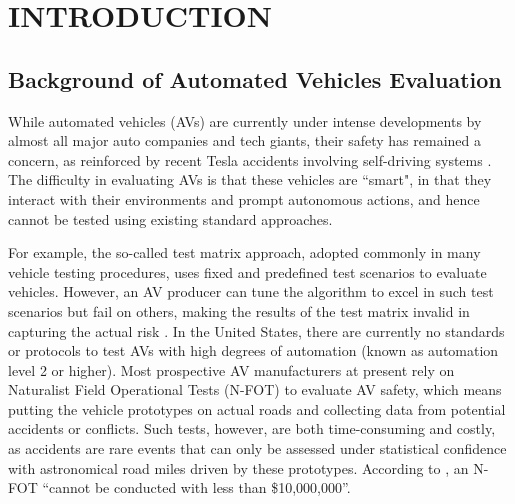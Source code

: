 \documentclass{wscpaperproc}
\theoremstyle{wsc}
\begin{document}
\section{INTRODUCTION}                                                                          
\subsection{Background of Automated Vehicles Evaluation}
While automated vehicles (AVs) are currently under intense developments by almost all major auto companies and tech giants, their safety has remained a concern, as reinforced by recent Tesla accidents involving self-driving systems \cite{teslanews}. The difficulty in evaluating AVs is that these vehicles are ``smart", in that they interact with their environments and prompt autonomous actions, and hence cannot be tested using existing standard approaches. 

For example, the so-called test matrix approach, adopted commonly in many vehicle testing procedures, uses fixed and predefined test scenarios to evaluate vehicles. However, an AV producer can tune the algorithm to excel in such test scenarios but fail on others, making the results of the test matrix invalid in capturing the actual risk \cite{Aust2012EvaluationSystems}. In the United States, there are currently no standards or protocols to test AVs with high degrees of automation (known as automation level 2 \cite{national2013preliminary} or higher). Most prospective AV manufacturers at present rely on Naturalist Field Operational Tests (N-FOT) \cite{festa2008festa} to evaluate AV safety, which means putting the vehicle prototypes on actual roads and collecting data from potential accidents or conflicts. Such tests, however, are both time-consuming and costly, as accidents are rare events that can only be assessed under statistical confidence with astronomical road miles driven by these prototypes. According to , an N-FOT ``cannot be conducted with less than \$10,000,000''.
\end{document}
